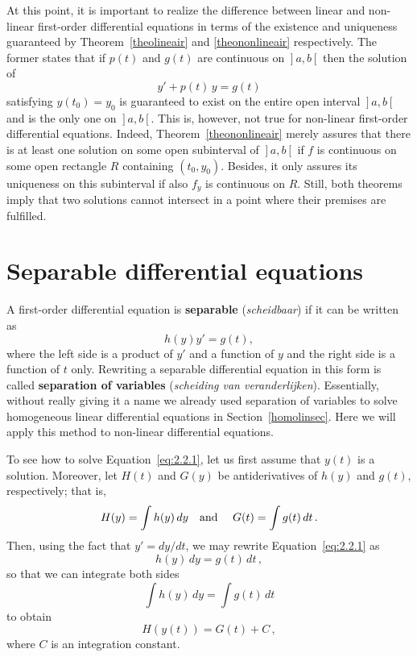 At this point, it is important to realize the difference between linear and non-linear first-order differential equations in terms of the existence and uniqueness guaranteed by Theorem~\ref{theolineair} and \ref{theononlineair} respectively.  The former states that if $p(t)$ and $g(t)$ are continuous on $\left.\right]a,b\left[\right.$ then the solution of
$$
y'+p(t)\,y=g(t)
$$
satisfying $y(t_0)=y_0$ is guaranteed to exist on the entire open interval $\left.\right]a,b\left[\right.$ and is the only one on $\left.\right]a,b\left[\right.$. This is, however, not true for non-linear first-order differential equations. Indeed, Theorem~\ref{theononlineair} merely assures that there is at least one solution on some open subinterval of $\left.\right]a,b\left[\right.$ if $f$ is continuous on some open rectangle $R$ containing $(t_0,y_0)$. Besides, it only assures its uniqueness on this subinterval if also  $f_y$ is continuous on  $R$. Still, both theorems imply that two solutions cannot intersect in a point where their premises are fulfilled. 

\section{Separable differential equations}

A first-order differential equation is \textbf{separable} (\textit{scheidbaar}) if it can be written as
\begin{equation} \label{eq:2.2.1}
h(y)y'=g(t),
\end{equation}
where the left side is a product of $y'$ and a function of $y$ and the right side is a function of $t$ only. Rewriting a separable
differential equation in this form is called \textbf{separation of variables} (\textit{scheiding van veranderlijken}). Essentially, without really giving it a name we already used separation of variables to solve homogeneous linear differential equations in Section~\ref{homolinsec}. Here we will apply this method to non-linear differential equations.    

To see how to solve Equation~\eqref{eq:2.2.1}, let us first assume that $y(t)$ is a solution. Moreover, let  $H(t)$ and $G(y)$ be antiderivatives of $h(y)$ and $g(t)$, respectively; that is,
\begin{equation} \label{eq:2.2.2}
H(y)=\displaystyle\int h(y) \, d y\mbox{\quad and \quad} G(t)=\displaystyle\int g(t) \, d t\,.
\end{equation}
Then, using the fact that $y'=d y/d t$, we may rewrite Equation~\eqref{eq:2.2.1} as
$$
h(y)\,d y=g(t)\,d t\,,
$$
so that we can integrate both sides
$$
\displaystyle\int h(y) \,d y=\displaystyle\int g(t) \,d t
$$
to obtain
\begin{equation} \label{eq:2.2.3}
H(y(t))=G(t)+C\,,
\end{equation}
where $C$ is an integration constant. 

